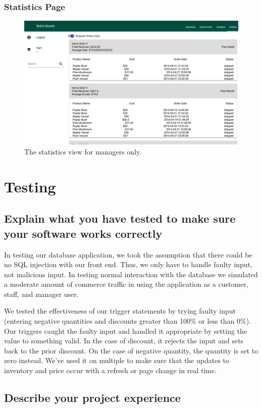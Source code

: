 \documentclass[letterpaper]{article}
\begin{document}
\subsubsection{Statistics Page}
\begin{figure}[H]
\centering
\includegraphics[width=.8\textwidth]{stats}
\caption{The statistics view for managers only.}
\label{cap-stats}
\end{figure}



\section{Testing}
\subsection{Explain what you have tested to make sure your software works correctly}

In testing our database application, we took the assumption that there could be no SQL injection with our front end.  Thus, we only have to handle faulty input, not malicious input.  In testing normal interaction with the database we simulated a moderate amount of commerce traffic in using the application as a customer, staff, and manager user.  

We tested the effectiveness of our trigger statements by trying faulty input (entering negative quantities and discounts greater than 100\% or less than 0\%).  Our triggers caught the faulty input and handled it appropriate by setting the value to something valid.  In the case of discount, it rejects the input and sets back to the prior discount.  On the case of negative quantity, the quantity is set to zero instead.  We’ve used it on multiple to make sure that the updates to inventory and price occur with a refresh or page change in real time.

\subsection{Describe your project experience}
\end{document}
